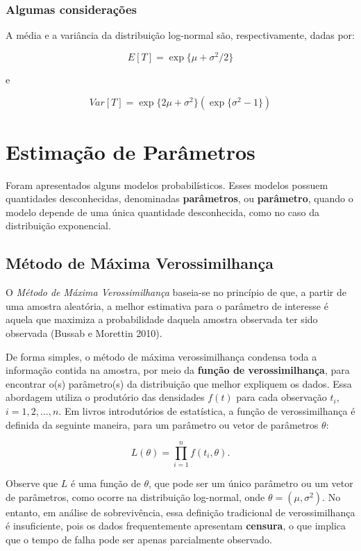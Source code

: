 \documentclass[
  12pt,
  letterpaper,
  DIV=11,
  numbers=noendperiod]{scrreprt}
\begin{document}
\subsubsection{Algumas
considerações}\label{algumas-considerauxe7uxf5es-2}

A média e a variância da distribuição log-normal são, respectivamente,
dadas por:

\[
E[T] = \exp\{ \mu + \sigma^{2} / 2 \}
\]

e

\[
Var[T] = \exp\{ 2 \mu + \sigma^{2} \} (\exp\{ \sigma^{2} - 1 \})
\]

\section{Estimação de
Parâmetros}\label{estimauxe7uxe3o-de-paruxe2metros}

Foram apresentados alguns modelos probabilísticos. Esses modelos possuem
quantidades desconhecidas, denominadas \textbf{parâmetros}, ou
\textbf{parâmetro}, quando o modelo depende de uma única quantidade
desconhecida, como no caso da distribuição exponencial.

\subsection{Método de Máxima
Verossimilhança}\label{muxe9todo-de-muxe1xima-verossimilhanuxe7a}

O \emph{Método de Máxima Verossimilhança} baseia-se no princípio de que,
a partir de uma amostra aleatória, a melhor estimativa para o parâmetro
de interesse é aquela que maximiza a probabilidade daquela amostra
observada ter sido observada (Bussab e Morettin 2010).

De forma simples, o método de máxima verossimilhança condensa toda a
informação contida na amostra, por meio da \textbf{função de
verossimilhança}, para encontrar o(s) parâmetro(s) da distribuição que
melhor expliquem os dados. Essa abordagem utiliza o produtório das
densidades \(f(t)\) para cada observação \(t_i\),
\(i = 1, 2, \ldots, n\). Em livros introdutórios de estatística, a
função de verossimilhança é definida da seguinte maneira, para um
parâmetro ou vetor de parâmetros \(\theta\):

\[
L(\theta) = \prod_{i = 1}^{n} f(t_{i}, \theta).
\]

Observe que \(L\) é uma função de \(\theta\), que pode ser um único
parâmetro ou um vetor de parâmetros, como ocorre na distribuição
log-normal, onde \(\theta = (\mu, \sigma^2)\). No entanto, em análise de
sobrevivência, essa definição tradicional de verossimilhança é
insuficiente, pois os dados frequentemente apresentam \textbf{censura},
o que implica que o tempo de falha pode ser apenas parcialmente
observado.
\end{document}
